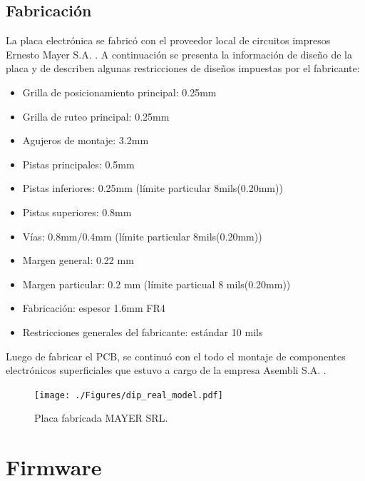   
\subsection{Fabricación}
La placa electrónica se fabricó con el proveedor local de circuitos impresos Ernesto Mayer S.A. \citep{web_mayer}. A continuación se presenta la información de diseño de la placa y de describen algunas  restricciones de diseños impuestas por el fabricante:

\begin{itemize}

\item Grilla de posicionamiento principal: 0.25mm
\item Grilla de ruteo principal: 0.25mm
\item Agujeros de montaje: 3.2mm
\item Pistas principales: 0.5mm
\item Pistas inferiores: 0.25mm (límite particular 8mils(0.20mm))
\item Pistas superiores: 0.8mm
\item Vías: 0.8mm/0.4mm (límite particular 8mils(0.20mm))
\item Margen general: 0.22 mm
\item Margen particular: 0.2 mm (límite particual 8 mils(0.20mm))
\item Fabricación: espesor 1.6mm FR4  
\item Restricciones generales del fabricante: estándar 10 mils

\end{itemize}

Luego de fabricar el PCB, se continuó con el todo el montaje de componentes electrónicos superficiales que estuvo a cargo de la empresa Asembli S.A. \citep{web_asembli}.


\begin{figure}[htbp]
	\centering
	\texttt{[image: ./Figures/dip\_real\_model.pdf]}
	\caption{Placa fabricada MAYER SRL.}
	\label{fig:dip_real_model}
\end{figure}


\section{Firmware}

